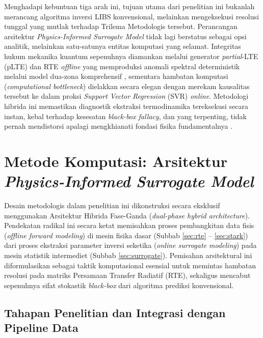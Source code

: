 \documentclass[10pt,leqno]{amsart}
\begin{document}
Menghadapi kebuntuan tiga arah ini, tujuan utama dari penelitian ini bukanlah merancang algoritma inversi LIBS konvensional, melainkan mengeksekusi resolusi tunggal yang mutlak terhadap Trilema Metodologis tersebut. Perancangan arsitektur \textit{Physics-Informed Surrogate Model} tidak lagi berstatus sebagai opsi analitik, melainkan satu-satunya entitas komputasi yang selamat. Integritas hukum mekanika kuantum sepenuhnya diamankan melalui generator \textit{partial}-LTE (pLTE) dan RTE \textit{offline} yang memproduksi anomali spektral deterministik melalui model dua-zona komprehensif \cite{zaitsev_two-zone_2024}, sementara hambatan komputasi (\textit{computational bottleneck}) dielakkan secara elegan dengan merekam kausalitas tersebut ke dalam proksi \textit{Support Vector Regression} (SVR) \textit{online}. Metodologi hibrida ini memastikan diagnostik ekstraksi termodinamika tereksekusi secara instan, kebal terhadap kesesatan \textit{black-box fallacy}, dan yang terpenting, tidak pernah mendistorsi apalagi mengkhianati fondasi fisika fundamentalnya \cite{favre_merlin_2025}.



\section{Metode Komputasi: Arsitektur \textit{Physics-Informed Surrogate Model}}

Desain metodologis dalam penelitian ini dikonstruksi secara eksklusif menggunakan Arsitektur Hibrida Fase-Ganda (\textit{dual-phase hybrid architecture}). Pendekatan radikal ini secara ketat memisahkan proses pembangkitan data fisis (\textit{offline forward modeling}) di mesin fisika dasar (Subbab \ref{sec:rte} -- \ref{sec:stark}) dari proses ekstraksi parameter inversi seketika (\textit{online surrogate modeling}) pada mesin statistik intermediet (Subbab \ref{sec:surrogate}). Pemisahan arsitektural ini diformulasikan sebagai taktik komputasional esensial untuk memintas hambatan resolusi pada matriks Persamaan Transfer Radiatif (RTE), sekaligus mencabut sepenuhnya sifat stokastik \textit{black-box} dari algoritma prediksi konvensional.

\subsection{Tahapan Penelitian dan Integrasi dengan Pipeline Data}
\end{document}
